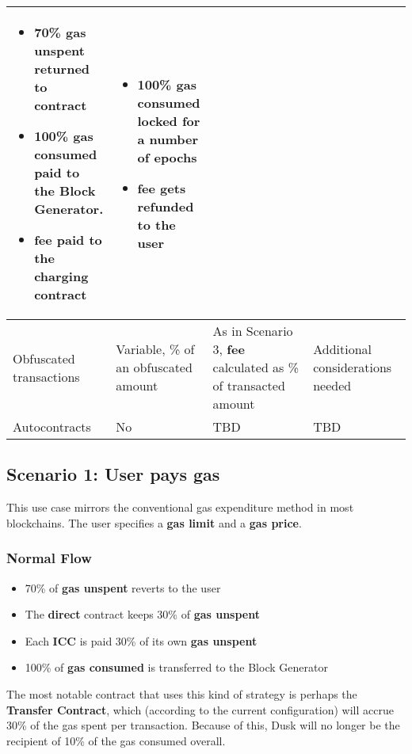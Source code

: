 \documentclass[twocolumn, nofootinbib]{revtex4-2}
\begin{document}
\begin{table*}[t]
\begin{tabular}{|m{0.15\linewidth}|m{0.1\linewidth}|m{0.45\linewidth}|m{0.3\linewidth}|}
\begin{itemize}
            \item 70\% \textbf{gas unspent} returned to contract
            \item 100\% \textbf{gas consumed} paid to the Block Generator.
            \item \textbf{fee} paid to the charging contract
        \end{itemize} &
        \begin{itemize}
            \item 100\% \textbf{gas consumed} locked for a number of epochs
            \item \textbf{fee} gets refunded to the \textbf{user}
        \end{itemize} \\
        \hline
        Obfuscated transactions & Variable, \% of an obfuscated amount & As in
        Scenario 3, \textbf{fee} calculated as \% of transacted amount &
        Additional considerations needed \\
        \hline
        Autocontracts & No & TBD & TBD \\
        \hline
    \end{tabular}
    \end{table*}

    \subsection{Scenario 1: User pays gas}\label{subsec:scenario-1}
    This use case mirrors the conventional gas expenditure method in most
    blockchains.
    The user specifies a \textbf{gas limit} and a \textbf{gas price}.

    \subsubsection{Normal Flow}\label{subsubsec:normal-flow-1}
    \begin{itemize}
        \item 70\% of \textbf{gas unspent} reverts to the user
        \item The \textbf{direct} contract keeps 30\% of \textbf{gas unspent}
        \item Each \textbf{ICC} is paid 30\% of its own \textbf{gas unspent}
        \item 100\% of \textbf{gas consumed} is transferred to the Block Generator
    \end{itemize}

    The most notable contract that uses this kind of strategy is perhaps the
    \textbf{Transfer Contract}, which (according to the current configuration)
    will accrue  30\% of the gas spent per transaction.
    Because of this, Dusk will no longer be the recipient of 10\% of the gas
    consumed overall.
\end{document}
